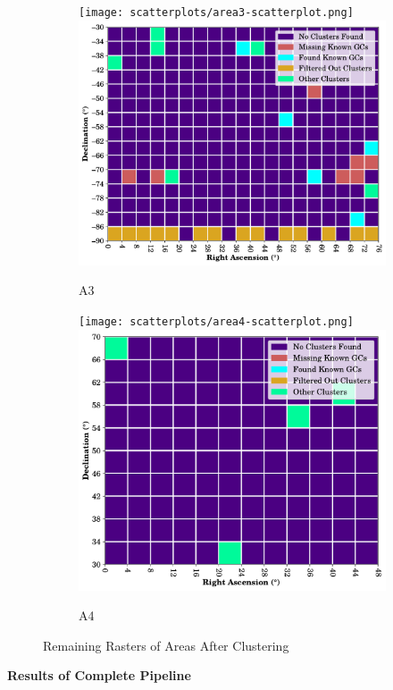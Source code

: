 \begin{figure}[H]
    \begin{subfigure}[b]{0.49\textwidth}
        \texttt{[image: scatterplots/area3-scatterplot.png]}
        \includegraphics[height=0.6\textwidth]{./figures/rasters/grids/grid-combined-a3.pdf}
        \caption{A3}
        \label{fig:a3-cluster-overview}
    \end{subfigure}
    \begin{subfigure}[b]{0.49\textwidth}
        \texttt{[image: scatterplots/area4-scatterplot.png]}
        \includegraphics[height=0.6\textwidth]{./figures/rasters/grids/grid-combined-a4.pdf}
        \caption{A4}
        \label{fig:a4-cluster-overview}
    \end{subfigure}

    \caption{Remaining Rasters of Areas After Clustering}
    \label{fig:filtered-cluster-rasters}
\end{figure}

\textbf{Results of Complete Pipeline}

